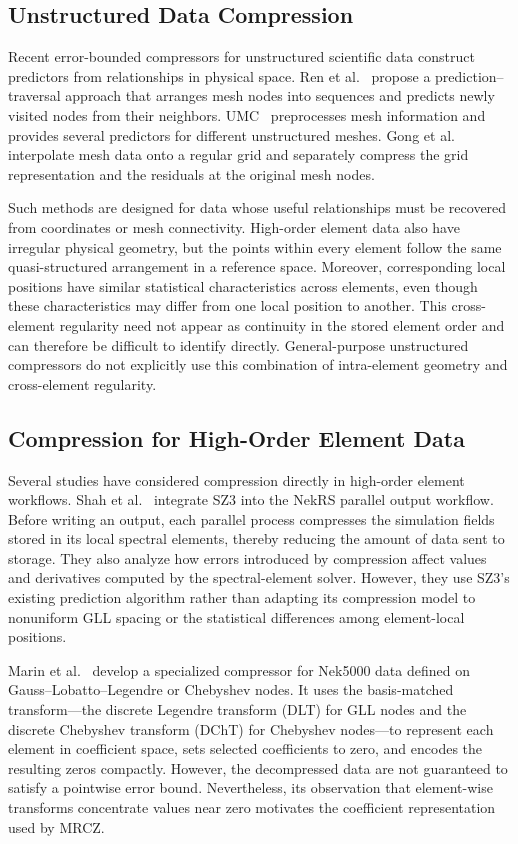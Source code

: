 \subsection{Unstructured Data Compression}

Recent error-bounded compressors for unstructured scientific data construct predictors from relationships in physical space. Ren et al.~\cite{ren2024prediction} propose a prediction--traversal approach that arranges mesh nodes into sequences and predicts newly visited nodes from their neighbors. UMC~\cite{wu2025enabling} preprocesses mesh information and provides several predictors for different unstructured meshes. Gong et al.~\cite{gong2024general} interpolate mesh data onto a regular grid and separately compress the grid representation and the residuals at the original mesh nodes.

Such methods are designed for data whose useful relationships must be recovered from coordinates or mesh connectivity. High-order element data also have irregular physical geometry, but the points within every element follow the same quasi-structured arrangement in a reference space. Moreover, corresponding local positions have similar statistical characteristics across elements, even though these characteristics may differ from one local position to another. This cross-element regularity need not appear as continuity in the stored element order and can therefore be difficult to identify directly. General-purpose unstructured compressors do not explicitly use this combination of intra-element geometry and cross-element regularity.

\subsection{Compression for High-Order Element Data}\label{sec:related work:prior work}

Several studies have considered compression directly in high-order element workflows. Shah et al.~\cite{shah2026solver} integrate SZ3 into the NekRS parallel output workflow. Before writing an output, each parallel process compresses the simulation fields stored in its local spectral elements, thereby reducing the amount of data sent to storage. They also analyze how errors introduced by compression affect values and derivatives computed by the spectral-element solver. However, they use SZ3's existing prediction algorithm rather than adapting its compression model to nonuniform GLL spacing or the statistical differences among element-local positions.

Marin et al.~\cite{marin2016spectral} develop a specialized compressor for Nek5000 data defined on Gauss--Lobatto--Legendre or Chebyshev nodes. It uses the basis-matched transform---the discrete Legendre transform (DLT) for GLL nodes and the discrete Chebyshev transform (DChT) for Chebyshev nodes---to represent each element in coefficient space, sets selected coefficients to zero, and encodes the resulting zeros compactly. However, the decompressed data are not guaranteed to satisfy a pointwise error bound. Nevertheless, its observation that element-wise transforms concentrate values near zero motivates the coefficient representation used by MRCZ.
